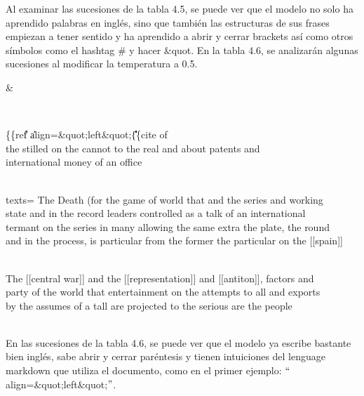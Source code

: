 Al examinar las sucesiones de la tabla 4.5, se puede ver que el modelo no solo ha aprendido palabras en inglés, sino que también las estructuras de sus frases empiezan a tener sentido y ha aprendido a abrir y cerrar brackets así como otros símbolos como el hashtag # y hacer \&quot. En la tabla 4.6, se analizarán algunas sucesiones al modificar la temperatura a 0.5.

\vspace{1em}




\begin{table}[htbp]
\begin{center}
\begin{tabular}{&}

\\ \hline

\{\{ref\| \| \|\| \|\| \|\- \| \| align=\&quot;left\&quot;\|\| \|\| \|\| \|\| \|\| \|\| \|\| \{\{cite of \\ the stilled on the cannot to the real and about patents and \\ international money of an office
\\ 
\\ \hline

texts= The Death (for the game of world that and the series and working \\ state and in the record leaders controlled as a talk of an international \\ termant on the series in many allowing the same extra the plate, the round \\ and in the process, is particular from the former the particular on the [[spain]]
\\ 
\\ \hline

The [[central war]] and the [[representation]] and [[antiton]], factors and \\ party of the world that entertainment on the attempts to all and exports \\ by the assumes of a tall are projected to the serious are the people
\\ 
\\ \hline


\end{tabular}
\caption{Segundo modelo de Hutter: temperatura 0.5}
\label{sucesiones hutter 1}
\end{center}
\end{table}

En las sucesiones de la tabla 4.6, se puede ver que el modelo ya escribe bastante bien inglés, sabe abrir y cerrar paréntesis y  tienen intuiciones del lenguage markdown que utiliza el documento, como en el primer ejemplo: $``$align=\&quot;left\&quot;$"$. 

